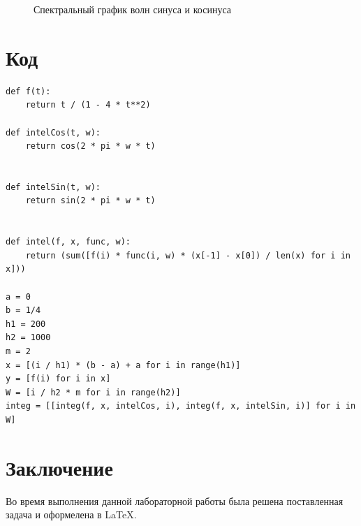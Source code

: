 \documentclass[14pt, titlepage,fleqn]{extarticle}
\begin{document}
\begin{figure}[H]
	\caption{Спектральный график волн синуса и косинуса}
\end{figure}
\newpage









\section*{Код}

\begin{lstlisting}
def f(t):
    return t / (1 - 4 * t**2)

def intelCos(t, w):
    return cos(2 * pi * w * t)


def intelSin(t, w):
    return sin(2 * pi * w * t)


def intel(f, x, func, w):
    return (sum([f(i) * func(i, w) * (x[-1] - x[0]) / len(x) for i in x]))

a = 0
b = 1/4
h1 = 200
h2 = 1000
m = 2
x = [(i / h1) * (b - a) + a for i in range(h1)]
y = [f(i) for i in x]
W = [i / h2 * m for i in range(h2)]
integ = [[integ(f, x, intelCos, i), integ(f, x, intelSin, i)] for i in W]

\end{lstlisting}
\newpage









\section*{Заключение}
Во время выполнения данной лабораторной работы была решена поставленная задача и оформелена в \LaTeX.
\end{document}
